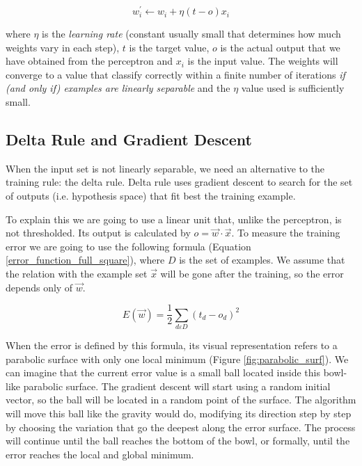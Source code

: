 	\begin{equation}
		\label{training_rule}
		w_{i}^{'} \leftarrow w_{i} + \eta (t - o) x_{i}
	\end{equation}

	where $\eta$ is the \textit{learning rate} (constant usually small that determines how much weights vary in each step), $t$ is the target value, $o$ is the actual output that we have obtained from the perceptron and $x_{i}$ is the input value. The weights will converge to a value that classify correctly within a finite number of iterations \textit{if (and only if) examples are linearly separable} and the $\eta$ value used is sufficiently small.
	
	\subsection{Delta Rule and Gradient Descent}
	When the input set is not linearly separable, we need an alternative to the training rule: the delta rule. Delta rule uses gradient descent to search for the set of outputs (i.e. hypothesis space) that fit best the training example. 

	To explain this we are going to use a linear unit that, unlike the perceptron, is not thresholded. Its output is calculated by $o = \vec{w} \cdot \vec{x}$. To measure the training error we are going to use the following formula (Equation \ref{error_function_full_square}), where $D$ is the set of examples. We assume that the relation with the example set $\vec{x}$ will be gone after the training, so the error depends only of $\vec{w}$.

	\begin{equation}
		\label{error_function_full_square}
		E(\vec{w}) = \frac{1}{2} \sum_{d \varepsilon D} (t_d-o_d)^2 
	\end{equation}

	When the error is defined by this formula, its visual representation refers to a parabolic surface with only one local minimum (Figure \ref{fig:parabolic_surf}). We can imagine that the current error value is a small ball located inside this bowl-like parabolic surface. The gradient descent will start using a random initial vector, so the ball will be located in a random point of the surface. The algorithm will move this ball like the gravity would do, modifying its direction step by step by choosing the variation that go the deepest along the error surface. The process will continue until the ball reaches the bottom of the bowl, or formally, until the error reaches the local and global minimum.

